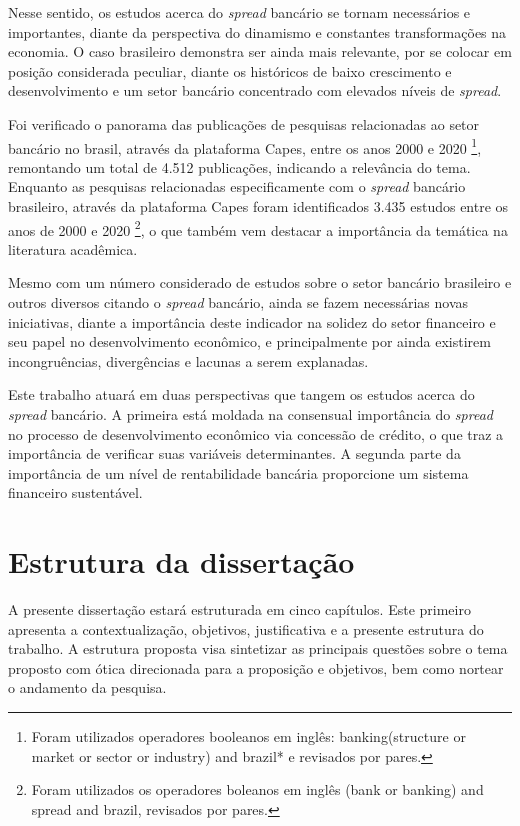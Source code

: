 \documentclass[12pt,12pt,openright,oneside,a4paper,chapter=TITLE,section=TITLE,subsection=TITLE,subsubsection=TITLE,english,french,spanish,portugues,sumario=tradicional]{abntex2}
\begin{document}
Nesse sentido, os estudos acerca do \emph{spread} bancário se tornam necessários e importantes, diante da perspectiva do dinamismo e constantes transformações na economia. O caso brasileiro demonstra ser ainda mais relevante, por se colocar em posição considerada peculiar, diante os históricos de baixo crescimento e desenvolvimento e um setor bancário concentrado com elevados níveis de \emph{spread}.

Foi verificado o panorama das publicações de pesquisas relacionadas ao setor bancário no brasil, através da plataforma Capes, entre os anos 2000 e 2020
\footnote{Foram utilizados operadores booleanos em inglês: banking(structure or
market or sector or industry) and brazil* e revisados por pares.}, remontando um total de 4.512 publicações, indicando a relevância do tema. Enquanto as pesquisas relacionadas especificamente com o \emph{spread} bancário brasileiro, através da plataforma Capes foram identificados 3.435 estudos entre os anos de 2000 e 2020 \footnote{Foram utilizados os operadores boleanos em
inglês (bank or banking) and spread and brazil, revisados por pares.}, o que também vem destacar a importância da temática na literatura acadêmica.

Mesmo com um número considerado de estudos sobre o setor bancário brasileiro e outros diversos citando o \emph{spread} bancário, ainda se fazem necessárias novas iniciativas, diante a importância deste indicador na solidez do setor financeiro e seu papel no desenvolvimento econômico, e principalmente por ainda existirem incongruências, divergências e lacunas a serem explanadas.

Este trabalho atuará em duas perspectivas que tangem os estudos acerca do \emph{spread} bancário. A primeira está moldada na consensual importância do \emph{spread} no processo de desenvolvimento econômico via concessão de crédito, o que traz a importância de verificar suas variáveis determinantes. A segunda parte da importância de um nível de rentabilidade bancária proporcione um sistema financeiro sustentável.

\section{Estrutura da dissertação}

A presente dissertação estará estruturada em cinco capítulos. Este primeiro apresenta a contextualização, objetivos, justificativa e a presente estrutura do trabalho. A estrutura proposta visa sintetizar as principais questões sobre o tema proposto com ótica direcionada para a proposição e objetivos, bem como nortear o andamento da pesquisa.
\end{document}
